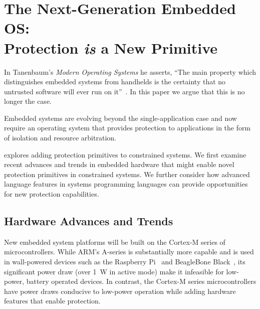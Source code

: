 \section{The Next-Generation Embedded OS:\\Protection \emph{is} a New Primitive}
\label{protection}

In Tanenbaum's \emph{Modern Operating Systems} he asserts, ``The main property
which distinguishes embedded systems from handhelds is the certainty that no
untrusted software will ever run on it''~\cite{tanenbaum}. In this paper we
argue that this is no longer the case.

Embedded systems are evolving beyond the single-application case and now require
an operating system that provides protection to applications in the form of
isolation and resource arbitration.


\name explores adding protection primitives to constrained systems. We first
examine recent advances and trends in embedded hardware that might enable novel
protection primitives in constrained systems. We further consider how advanced
language features in systems programming languages can provide opportunities for
new protection capabilities.


%
%

\subsection{Hardware Advances and Trends}

New embedded system platforms will be built on the Cortex-M series of microcontrollers.
While ARM's A-series is substantially more capable and is used in wall-powered
devices such as the Raspberry Pi~\cite{rpi} and BeagleBone Black~\cite{bbb},
its significant power draw (over 1~W in active mode) make it infeasible for
low-power, battery operated devices.
In contrast, the Cortex-M series microcontrollers have power draws conducive
to low-power operation while adding hardware features that enable protection.


